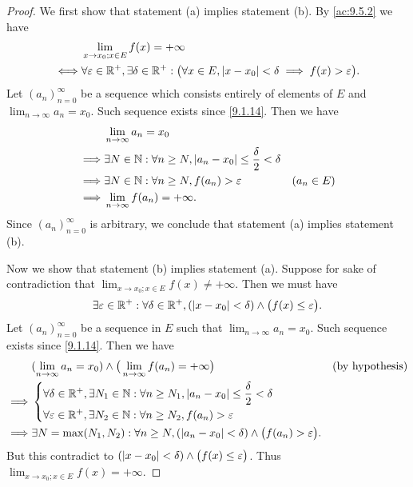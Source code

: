 \begin{proof}
  We first show that statement (a) implies statement (b).
  By \cref{ac:9.5.2} we have
  \begin{align*}
         & \lim_{x \to x_0 ; x \in E} f(x) = +\infty                                                                                              \\
    \iff & \forall \varepsilon \in \mathbb{R}^+, \exists \delta \in \mathbb{R}^+ : \big(\forall x \in E, \left\lvert x - x_0\right\rvert < \delta \implies f(x) > \varepsilon\big).
  \end{align*}
  Let \((a_n)_{n = 0}^\infty\) be a sequence which consists entirely of elements of \(E\) and \(\lim_{n \to \infty} a_n = x_0\).
  Such sequence exists since \cref{9.1.14}.
  Then we have
  \begin{align*}
             & \lim_{n \to \infty} a_n = x_0                                                                      \\
    \implies & \exists N \in \mathbb{N} : \forall n \geq N, \left\lvert a_n - x_0\right\rvert \leq \dfrac{\delta}{2} < \delta               \\
    \implies & \exists N \in \mathbb{N} : \forall n \geq N, f(a_n) > \varepsilon                            & (a_n \in E) \\
    \implies & \lim_{n \to \infty} f(a_n) = +\infty.
  \end{align*}
  Since \((a_n)_{n = 0}^\infty\) is arbitrary, we conclude that statement (a) implies statement (b).

  Now we show that statement (b) implies statement (a).
  Suppose for sake of contradiction that \(\lim_{x \to x_0 ; x \in E} f(x) \neq +\infty\).
  Then we must have
  \[
    \exists \varepsilon \in \mathbb{R}^+ : \forall \delta \in \mathbb{R}^+, (\left\lvert x - x_0\right\rvert < \delta) \land \big(f(x) \leq \varepsilon\big).
  \]
  Let \((a_n)_{n = 0}^\infty\) be a sequence in \(E\) such that \(\lim_{n \to \infty} a_n = x_0\).
  Such sequence exists since \cref{9.1.14}.
  Then we have
  \begin{align*}
             & (\lim_{n \to \infty} a_n = x_0) \land \big(\lim_{n \to \infty} f(a_n) = +\infty\big)                                 &  & \text{(by hypothesis)} \\
    \implies & \begin{dcases}
                 \forall \delta \in \mathbb{R}^+, \exists N_1 \in \mathbb{N} : \forall n \geq N_1, \left\lvert a_n - x_0\right\rvert \leq \dfrac{\delta}{2} < \delta \\
                 \forall \varepsilon \in \mathbb{R}^+, \exists N_2 \in \mathbb{N} : \forall n \geq N_2, f(a_n) > \varepsilon
               \end{dcases}                                \\
    \implies & \exists N = \max(N_1, N_2) : \forall n \geq N, (\left\lvert a_n - x_0\right\rvert < \delta) \land \big(f(a_n) > \varepsilon\big).
  \end{align*}
  But this contradict to \((\left\lvert x - x_0\right\rvert < \delta) \land \big(f(x) \leq \varepsilon\big)\).
  Thus \(\lim_{x \to x_0 ; x \in E} f(x) = +\infty\).
\end{proof}

